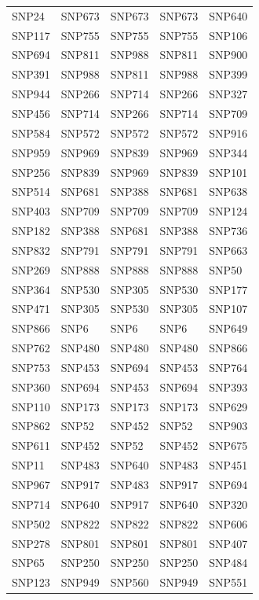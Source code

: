 \begin{table}[ht]
\begin{tabular}{lllll}
  SNP24 & SNP673 & SNP673 & SNP673 & SNP640 \\ 
  SNP117 & SNP755 & SNP755 & SNP755 & SNP106 \\ 
  SNP694 & SNP811 & SNP988 & SNP811 & SNP900 \\ 
  SNP391 & SNP988 & SNP811 & SNP988 & SNP399 \\ 
  SNP944 & SNP266 & SNP714 & SNP266 & SNP327 \\ 
  SNP456 & SNP714 & SNP266 & SNP714 & SNP709 \\ 
  SNP584 & SNP572 & SNP572 & SNP572 & SNP916 \\ 
  SNP959 & SNP969 & SNP839 & SNP969 & SNP344 \\ 
  SNP256 & SNP839 & SNP969 & SNP839 & SNP101 \\ 
  SNP514 & SNP681 & SNP388 & SNP681 & SNP638 \\ 
  SNP403 & SNP709 & SNP709 & SNP709 & SNP124 \\ 
  SNP182 & SNP388 & SNP681 & SNP388 & SNP736 \\ 
  SNP832 & SNP791 & SNP791 & SNP791 & SNP663 \\ 
  SNP269 & SNP888 & SNP888 & SNP888 & SNP50 \\ 
  SNP364 & SNP530 & SNP305 & SNP530 & SNP177 \\ 
  SNP471 & SNP305 & SNP530 & SNP305 & SNP107 \\ 
  SNP866 & SNP6 & SNP6 & SNP6 & SNP649 \\ 
  SNP762 & SNP480 & SNP480 & SNP480 & SNP866 \\ 
  SNP753 & SNP453 & SNP694 & SNP453 & SNP764 \\ 
  SNP360 & SNP694 & SNP453 & SNP694 & SNP393 \\ 
  SNP110 & SNP173 & SNP173 & SNP173 & SNP629 \\ 
  SNP862 & SNP52 & SNP452 & SNP52 & SNP903 \\ 
  SNP611 & SNP452 & SNP52 & SNP452 & SNP675 \\ 
  SNP11 & SNP483 & SNP640 & SNP483 & SNP451 \\ 
  SNP967 & SNP917 & SNP483 & SNP917 & SNP694 \\ 
  SNP714 & SNP640 & SNP917 & SNP640 & SNP320 \\ 
  SNP502 & SNP822 & SNP822 & SNP822 & SNP606 \\ 
  SNP278 & SNP801 & SNP801 & SNP801 & SNP407 \\ 
  SNP65 & SNP250 & SNP250 & SNP250 & SNP484 \\ 
  SNP123 & SNP949 & SNP560 & SNP949 & SNP551 \\ 

\end{tabular}
\end{table}
